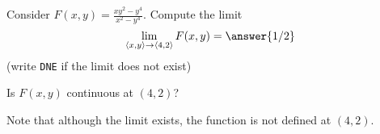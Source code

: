 \documentclass{ximera}
\author{Jim Talamo \and Bart Snapp}
\begin{document}
\begin{exercise}
  Consider $F(x,y) = \frac{xy^2-y^4}{x^2-y^4}$.  Compute the limit
  \[
  \lim_{\vector{x,y}\to \vector{4,2}} F(x,y) = \answer{1/2}
  \]
    (write \verb|DNE| if the limit does not exist)
  \begin{exercise}
  Is $F(x,y)$ continuous at $(4,2)$?
  \begin{multipleChoice}
  \end{multipleChoice}
  
  \begin{feedback}[correct]
Note that although the limit exists, the function is not defined at $(4,2)$.
\end{feedback}
  \end{exercise}
\end{exercise}
\end{document}
